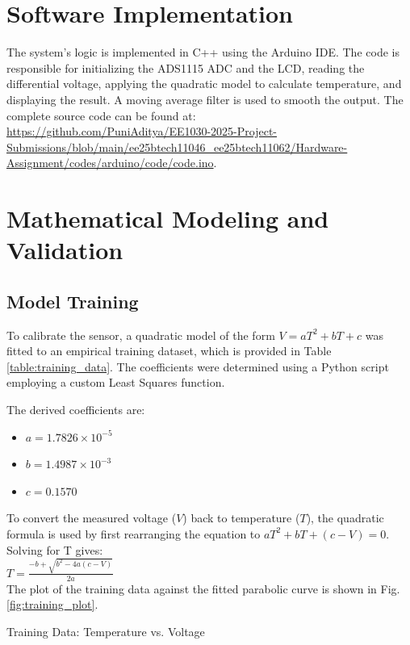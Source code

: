 \documentclass[conference]{IEEEtran}
\begin{document}
\section{Software Implementation}
The system's logic is implemented in C++ using the Arduino IDE. The code is responsible for initializing the ADS1115 ADC and the LCD, reading the differential voltage, applying the quadratic model to calculate temperature, and displaying the result. A moving average filter is used to smooth the output. The complete source code can be found at: \\
{\url{https://github.com/PuniAditya/EE1030-2025-Project-Submissions/blob/main/ee25btech11046_ee25btech11062/Hardware-Assignment/codes/arduino/code/code.ino}}.

\section{Mathematical Modeling and Validation}
\subsection{Model Training}
To calibrate the sensor, a quadratic model of the form $V = aT^2 + bT + c$ was fitted to an empirical training dataset, which is provided in Table \ref{table:training_data}. The coefficients were determined using a Python script employing a custom Least Squares function.

The derived coefficients are:
\begin{itemize}
    \item $a = 1.7826 \times 10^{-5}$
    \item $b = 1.4987 \times 10^{-3}$
    \item $c = 0.1570$
\end{itemize}

To convert the measured voltage ($V$) back to temperature ($T$), the quadratic formula is used by first rearranging the equation to $aT^2 + bT + (c - V) = 0$. Solving for T gives:
\\[10pt]
$T = \frac{-b + \sqrt{b^2 - 4a(c - V)}}{2a}$
\\[10pt]

The plot of the training data against the fitted parabolic curve is shown in Fig. \ref{fig:training_plot}.

\begin{table}[!h]
  \centering
  \caption{Training Data: Temperature vs. Voltage}
  \label{table:training_data}
  
\end{table}
\end{document}
